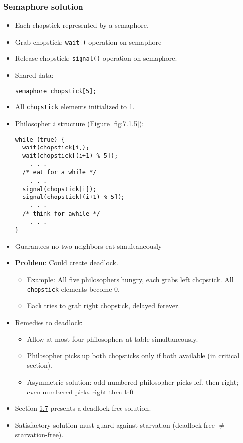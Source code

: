 \begin{itemize}
    \subsubsection{Semaphore solution}
    \begin{itemize}
        \item Each chopstick represented by a semaphore.
        \item Grab chopstick: \texttt{wait()} operation on semaphore.
        \item Release chopstick: \texttt{signal()} operation on semaphore.
        \item Shared data:
        \begin{verbatim}
semaphore chopstick[5];
\end{verbatim}
        \item All \texttt{chopstick} elements initialized to 1.
        \item Philosopher $i$ structure (Figure \ref{fig:7.1.5}):
        \begin{verbatim}
while (true) {
  wait(chopstick[i]);
  wait(chopstick[(i+1) % 5]);
    . . .
  /* eat for a while */
    . . .
  signal(chopstick[i]);
  signal(chopstick[(i+1) % 5]);
    . . .
  /* think for awhile */
    . . .
}
        \end{verbatim}
        \item Guarantees no two neighbors eat simultaneously.
        \item \textbf{Problem}: Could create deadlock.
        \begin{itemize}
            \item Example: All five philosophers hungry, each grabs left chopstick. All \texttt{chopstick} elements become 0.
            \item Each tries to grab right chopstick, delayed forever.
        \end{itemize}
        \item Remedies to deadlock:
        \begin{itemize}
            \item Allow at most four philosophers at table simultaneously.
            \item Philosopher picks up both chopsticks only if both available (in critical section).
            \item Asymmetric solution: odd-numbered philosopher picks left then right; even-numbered picks right then left.
        \end{itemize}
        \item Section \hyperref[sec:6.7]{6.7} presents a deadlock-free solution.
        \item Satisfactory solution must guard against starvation (deadlock-free $\neq$ starvation-free).
    \end{itemize}


\end{itemize}
